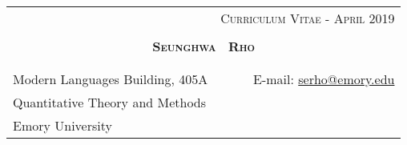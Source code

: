 \documentclass[10pt]{article}
\begin{document}
\begin{center}
\begin{tabular}{lr}
& \textsc{Curriculum Vitae - April 2019} \\
\multicolumn{2}{p{500pt}}{}\\
\multicolumn{2}{c}{{\Large \textsc{\textbf{Seunghwa \ Rho }}}} \\\\ 
\hline\\
Modern Languages Building, 405A   & E-mail: \href{mailto:serho@emory.edu}{serho@emory.edu} \\
\multicolumn{2}{l}{Quantitative Theory and Methods}\\
\multicolumn{2}{l}{Emory University}\\
\end{tabular}


\end{center}
\end{document}
